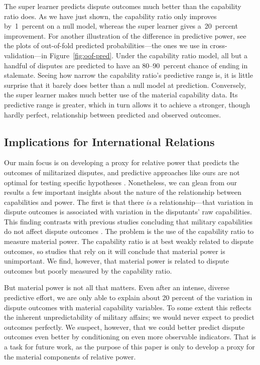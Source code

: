The super learner predicts dispute outcomes much better than the capability ratio does.
As we have just shown, the capability ratio only improves by~1~percent on a null model, whereas the super learner gives a~20~percent improvement.
For another illustration of the difference in predictive power, see the plots of out-of-fold predicted probabilities---the ones we use in cross-validation---in Figure~\ref{fig:oof-pred}.
Under the capability ratio model, all but a handful of disputes are predicted to have an 80--90~percent chance of ending in stalemate.
Seeing how narrow the capability ratio's predictive range is, it is little surprise that it barely does better than a null model at prediction.
Conversely, the super learner makes much better use of the material capability data.
Its predictive range is greater, which in turn allows it to achieve a stronger, though hardly perfect, relationship between predicted and observed outcomes.

\subsection{Implications for International Relations}

Our main focus is on developing a proxy for relative power that predicts the outcomes of militarized disputes, and predictive approaches like ours are not optimal for testing specific hypotheses \citep{Shmueli:2010jd}.
Nonetheless, we can glean from our results a few important insights about the nature of the relationship between capabilities and power.
The first is that there \emph{is} a relationship---that variation in dispute outcomes is associated with variation in the disputants' raw capabilities.
This finding contrasts with previous studies concluding that military capabilities do not affect dispute outcomes \citep{Maoz:1983cw}.
The problem is the use of the capability ratio to measure material power.
The capability ratio is at best weakly related to dispute outcomes, so studies that rely on it will conclude that material power is unimportant.
We find, however, that material power is related to dispute outcomes but poorly measured by the capability ratio.

But material power is not all that matters.
Even after an intense, diverse predictive effort, we are only able to explain about 20 percent of the variation in dispute outcomes with material capability variables.
To some extent this reflects the inherent unpredictability of military affairs; we would never expect to predict outcomes perfectly.
We suspect, however, that we could better predict dispute outcomes even better by conditioning on even more observable indicators.
That is a task for future work, as the purpose of this paper is only to develop a proxy for the material components of relative power.

